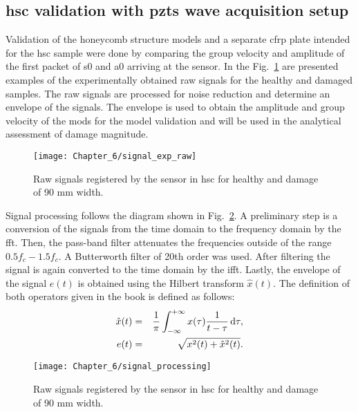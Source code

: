 \subsection{\acs{hsc} validation with \acsp{pzt} wave acquisition setup}
Validation of the honeycomb structure models and a separate \ac{cfrp} plate intended for the \ac{hsc} sample were done by comparing the group velocity and amplitude of the first packet of \ac{s0} and \ac{a0} arriving at the sensor.
In the Fig.~\ref{fig:signal_exp_raw} are presented examples of the experimentally obtained raw signals for the healthy and damaged samples.
The raw signals are processed for noise reduction and determine an envelope of the signals.
The envelope is used to obtain the amplitude and group velocity of the mods for the model validation and will be used in the analytical assessment of damage magnitude.
\begin{figure}[H]
	\begin{center}
		\texttt{[image: Chapter\_6/signal\_exp\_raw]}
	\end{center}
	\caption{Raw signals registered by the sensor in \acf{hsc} for healthy and damage of 90 \unit{\mm} width.}
	\label{fig:signal_exp_raw}
\end{figure}

Signal processing follows the diagram shown in Fig.~\ref{fig:signal_processing}.
A preliminary step is a conversion of the signals from the time domain to the frequency domain by the \ac{fft}.
Then, the pass-band filter attenuates the frequencies outside of the range \(0.5f_c-1.5f_c\).
A Butterworth filter of 20th order was used.
After filtering the signal is again converted to the time domain by the \ac{ifft}.
Lastly, the envelope of the signal \(e(t)\) is obtained using the Hilbert transform \(\hat{x}(t)\). The definition of both operators given in the book \cite{staszewski2004health} is defined as follows:
\begin{eqnarray}
	\hat{x}(t) &=& \frac{1}{\pi}\int_{-\infty}^{+\infty}x(\tau)\frac{1}{t-\tau}\mathop{}\!\mathrm{d}\tau,\\
	e(t) &=& \sqrt{x^2(t)+\hat{x}^2(t)}.
\end{eqnarray}

\begin{figure}[H]
	\begin{center}
		\texttt{[image: Chapter\_6/signal\_processing]}
	\end{center}
	\caption{Raw signals registered by the sensor in \acf{hsc} for healthy and damage of 90 \unit{\mm} width.}
	\label{fig:signal_processing}
\end{figure}

